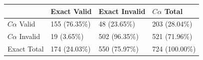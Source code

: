 \begin{tabular}{llll}
\toprule
 & Exact Valid & Exact Invalid & $C\alpha$ Total \\
\midrule
$C\alpha$ Valid & 155 (76.35\%) & 48 (23.65\%) & 203 (28.04\%) \\
$C\alpha$ Invalid & 19 (3.65\%) & 502 (96.35\%) & 521 (71.96\%) \\
Exact Total & 174 (24.03\%) & 550 (75.97\%) & 724 (100.00\%) \\
\bottomrule
\end{tabular}
